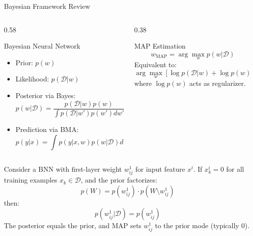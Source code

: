 \documentclass[unicode]{beamer}
\numberwithin{equation}{section}
\begin{document}
\begin{frame}{Bayesian Framework Review}
    \begin{columns}[T]
        \begin{column}{0.58\textwidth}
            \begin{block}{Bayesian Neural Network}
                \begin{itemize}
                    \item Prior: \( p(w) \)
                    \item Likelihood: \( p(\mathcal{D}|w) \)
                    \item Posterior via Bayes:
                    \[
                    p(w|\mathcal{D}) = \frac{p(\mathcal{D}|w)p(w)}{\int p(\mathcal{D}|w')p(w')dw'}
                    \]
                    \item Prediction via BMA:
                    \[
                    p(y|x) = \int p(y|x,w)p(w|\mathcal{D})dw
                    \]
                \end{itemize}
            \end{block}
        \end{column}
        \begin{column}{0.38\textwidth}
            \begin{block}{MAP Estimation}
                \[
                w_{\text{MAP}} = \arg\max_w p(w|\mathcal{D})
                \]
                Equivalent to:
                \[
                \arg\max_w \left[ \log p(\mathcal{D}|w) + \log p(w) \right]
                \]
                where \(\log p(w)\) acts as regularizer.
            \end{block}
        \end{column}
    \end{columns}
\end{frame}
\begin{frame}
    \begin{theorem}
    Consider a BNN with first-layer weight \( w_{ij}^1 \) for input feature \( x^i \). If \( x_k^i = 0 \) for all training examples \( x_k \in \mathcal{D} \), and the prior factorizes:
    \[
    p(W) = p(w_{ij}^1) \cdot p(W \setminus w_{ij}^1)
    \]
    then:
    \[
    p(w_{ij}^1|\mathcal{D}) = p(w_{ij}^1)
    \]
    The posterior equals the prior, and MAP sets \( w_{ij}^1 \) to the prior mode (typically 0).
    \end{theorem}
\end{frame}
\end{document}
